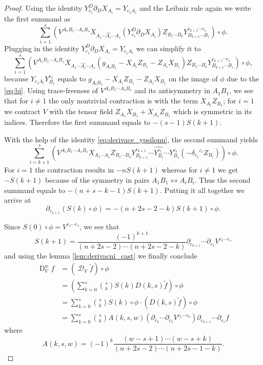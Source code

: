 \documentclass[final]{birkmult}
\theoremstyle{definition}
\theoremstyle{remark}
\numberwithin{equation}{section}
\newcommand{\p}[1]{\partial_{#1}}
\DeclareMathOperator{\D}{D}
\DeclareMathOperator{\aD}{\mathcal{D}}
\newcommand{\di}[2]{{\delta_{#1}}^{#2}}
\begin{document}
\begin{proof}
Using the identity $Y_{c_1}^D\p{D} X_{A_i} = Y_{c_1A_i}$  and the Leibniz rule again we write the first summand as
\[
 \sum_{i=1}^s (V^{A_1 B_1 \cdots  A_s B_s} X_{A_1 \cdots \widehat{A_i} \cdots  A_s} (Y_{c_1}^D\p{D} X_{A_i}) Z_{B_1\cdots B_k} Y_{B_{k+1}\cdots B_s}^{c_{k+1}\cdots c_s}) \circ \phi.
\] 
Plugging in the identity $Y_{c_1}^D\p{D} X_{A_i} = Y_{c_1A_i}$ we can simplify it to 
\[
  \sum_{i=1}^s\left(  V^{A_1 B_1 \cdots  A_s B_s} X_{A_1 \cdots \widehat{A_i} \cdots  A_s}(g_{A_iB_1} - X_{A_i}Z_{B_1} - Z_{A_i}X_{B_1}) Z_{B_1\cdots B_k} Y_{B_{k+1}\cdots B_s}^{c_{k+1}\cdots c_s}\right)\circ \phi,
\]
because $Y_{c_1A_i}Y^{c_1}_{B_1}$ equals to $g_{A_iB_1} - X_{A_i}Z_{B_1} - Z_{A_i}X_{B_1}$ on the image of $\phi$ due to the \eqref{eq:bi}. Using trace-freeness of $V^{A_1 B_1 \cdots  A_s B_s}$ and its antisymmetry in $A_1B_1$, we see that for $i\neq1$ the only nontrivial contraction is with the term $X_{A_i}Z_{B_1}$; for $i=1$ we contract $V$ with the tensor field $Z_{A_1}X_{B_1}+X_{A_1}Z_{B_1}$ which is symmetric in its indices. Therefore the first summand  equals to $-(s-1)S(k+1)$.

With the help of the identity \eqref{eq:derivace_ypsilonu}, the second summand yields
\[
	\sum_{i=k+1}^s \left( V^{A_1 B_1 \cdots  A_s B_s} X_{A_1 \cdots  A_s} Z_{B_1\cdots B_k} Y_{B_{k+1}}^{c_{k+1}}\cdots \widehat{Y_{B_i}^{c_i}} \cdots Y_{B_s}^{c_s} (- \di{c_1}{c_i} Z_{B_i}) \right) \circ \phi.
\]
For $i=1$ the contraction results in $-nS(k+1)$ whereas for $i \neq 1$ we get $-S(k+1)$ because of the symmetry in pairs $A_1B_1 \leftrightarrow A_iB_i$. Thus the second summand equals to $-(n+s-k-1)S(k+1)$. Putting it all together we arrive at
\begin{equation*}
	 \p{c_{k+1}}(S(k)\circ \phi)  = - (n+2s-2-k) S(k+1) \circ \phi.
\end{equation*}

Since $S(0) \circ \phi = V^{c_1\cdots c_s}$, we see that 
\[
 S(k+1) = \frac{(-1)^{k+1}}{(n+2s-2)\cdots(n+2s-2-k)} \p{c_{k+1}}\cdots \p{c_1}V^{c_1\cdots c_s}
\] and using the lemma \ref{lem:derivacni_cast} we finally conclude 
\begin{align*}
	\D^w_V f & = (\aD_V \tilde{f}) \circ \phi \\
		      & = \left(\sum_{k=0}^{s} \binom{s}{k} S(k)D(k,s)\tilde{f}\right)\circ \phi \\
				& = \sum_{k=0}^{s} \binom{s}{k} S(k)\circ \phi \cdot (D(k,s) \tilde{f})\circ \phi  \\
				& = \sum_{k=0}^{s} \binom{s}{k} A(k,s,w)  ( \p{c_k}\cdots \p{c_1}V^{c_1\cdots c_k}) \p{c_{k+1}}\cdots \p{c_s} f
\end{align*}
where
\[
A(k,s,w) = (-1)^k \frac{ (w-s+1)\cdots(w-s+k) }{(n+2s-2)\cdots(n+2s-1-k)}.
\]
\end{proof}
\end{document}
